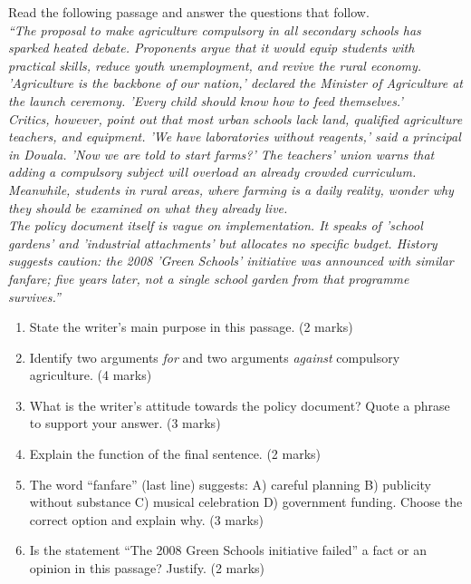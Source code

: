\documentclass[11pt]{article}
\begin{document}
\begin{exercice}
Read the following passage and answer the questions that follow.\\
\emph{``The proposal to make agriculture compulsory in all secondary schools has sparked heated debate. Proponents argue that it would equip students with practical skills, reduce youth unemployment, and revive the rural economy. 'Agriculture is the backbone of our nation,' declared the Minister of Agriculture at the launch ceremony. 'Every child should know how to feed themselves.'\\
Critics, however, point out that most urban schools lack land, qualified agriculture teachers, and equipment. 'We have laboratories without reagents,' said a principal in Douala. 'Now we are told to start farms?' The teachers' union warns that adding a compulsory subject will overload an already crowded curriculum. Meanwhile, students in rural areas, where farming is a daily reality, wonder why they should be examined on what they already live.\\
The policy document itself is vague on implementation. It speaks of 'school gardens' and 'industrial attachments' but allocates no specific budget. History suggests caution: the 2008 'Green Schools' initiative was announced with similar fanfare; five years later, not a single school garden from that programme survives.''}
\begin{enumerate}
\item State the writer's main purpose in this passage. (2 marks)
\item Identify two arguments \emph{for} and two arguments \emph{against} compulsory agriculture. (4 marks)
\item What is the writer's attitude towards the policy document? Quote a phrase to support your answer. (3 marks)
\item Explain the function of the final sentence. (2 marks)
\item The word ``fanfare'' (last line) suggests: A) careful planning B) publicity without substance C) musical celebration D) government funding. Choose the correct option and explain why. (3 marks)
\item Is the statement ``The 2008 Green Schools initiative failed'' a fact or an opinion in this passage? Justify. (2 marks)
\end{enumerate}
\end{exercice}
\end{document}
